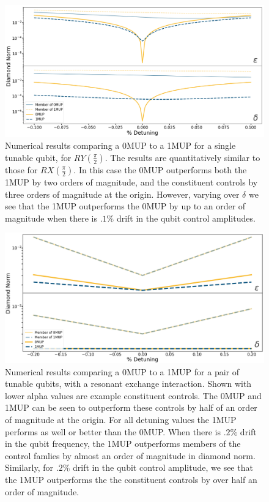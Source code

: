 \documentclass[aps,nofootinbib,pra,notitlepage,twocolumn]{revtex4-1}
\begin{document}
\begin{figure}[h]
  \centering
  \includegraphics[width=\textwidth]{SQRTY.png}
  \caption{Numerical results comparing a 0MUP to a 1MUP for a single tunable qubit, for $RY(\frac{\pi}{2})$. The results are quantitatively similar to those for $RX(\frac{\pi}{2})$. In this case the 0MUP outperforms both the 1MUP by two orders of magnitude, and the constituent controls by three orders of magnitude at the origin. However, varying over $\delta$ we see that the 1MUP outperforms the 0MUP by up to an order of magnitude when there is $.1\%$ drift in the qubit control amplitudes.}
  \label{fig:YMUP}
\end{figure}


\begin{figure}[h]
  \centering
  \includegraphics[width=\textwidth]{2QRBC.png}
  \caption{Numerical results comparing a 0MUP to a 1MUP for a pair of tunable qubits, with a resonant exchange interaction. Shown with lower alpha values are example constituent controls. The 0MUP and 1MUP can be seen to outperform these controls by half of an order of magnitude at the origin. For all detuning values the 1MUP performs as well or better than the 0MUP. When there is $.2\%$ drift in the qubit frequency, the 1MUP outperforms members of the control famlies by almost an order of magnitude in diamond norm. Similarly, for $.2\%$ drift in the qubit control amplitude, we see that the 1MUP outperforms the the constituent controls by over half an order of magnitude.}
  \label{fig:2MUP}
\end{figure}


\end{document}
